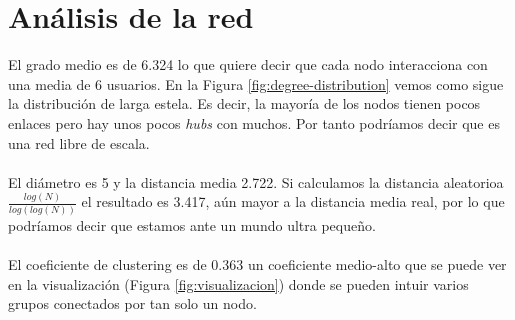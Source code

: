 \section{Análisis de la red}

El grado medio es de 6.324 lo que quiere decir que cada nodo interacciona con una media de 6 usuarios. En la Figura \ref{fig:degree-distribution} vemos como sigue la distribución de larga estela. Es decir, la mayoría de los nodos tienen pocos enlaces pero hay unos pocos \textit{hubs} con muchos. Por tanto podríamos decir que es una red libre de escala.
\\ \\
El diámetro es 5 y la distancia media 2.722. Si calculamos la distancia aleatorioa $ \frac{log(N)}{log(log(N))} $ el resultado es 3.417, aún mayor a la distancia media real, por lo que podríamos decir que estamos ante un mundo ultra pequeño.
\\ \\
El coeficiente de clustering es de 0.363 un coeficiente medio-alto que se puede ver en la visualización (Figura \ref{fig:visualizacion}) donde se pueden intuir varios grupos conectados por tan solo un nodo.


\newpage



